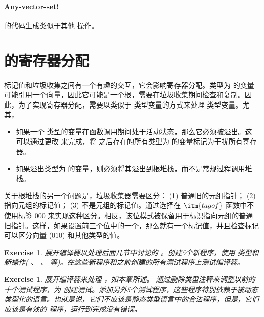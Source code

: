\documentclass[11pt]{book}
\newtheorem{exercise}[theorem]{Exercise}
\begin{document}
\paragraph{Any-vector-set!}

  的代码生成类似于其他  操作。

\section{ \LangAny{} 的寄存器分配}
\label{sec:register-allocation-Rany}

标记值和垃圾收集之间有一个有趣的交互，它会影响寄存器分配。类型为  的变量可能引用一个向量，因此它可能是一个根，需要在垃圾收集期间检查和复制。因此，为了实现寄存器分配，需要以类似于  类型变量的方式来处理  类型变量。尤其，
\begin{itemize}
\item 如果一个  类型的变量在函数调用期间处于活动状态，那么它必须被溢出。这可以通过更改  来完成，将  之后存在的所有类型为 
的变量标记为干扰所有寄存器。

\item 如果溢出类型为  的变量，则必须将其溢出到根堆栈，而不是常规过程调用堆栈。
\end{itemize}

关于根堆栈的另一个问题是，垃圾收集器需要区分： (1) 普通旧的元组指针； (2) 指向元组的标记值； (3) 不是元组的标记值。通过选择在 $\itm{tagof}$
函数中不使用标签 $000$ 来实现这种区分。相反，该位模式被保留用于标识指向元组的普通旧指针。这样，如果设置前三个位中的一个，那么就有一个标记值，并且检查标记可以区分向量 ($010$) 和其他类型的值。

\begin{exercise}\normalfont
展开编译器以处理后面几节中讨论的 \LangAny{} 。创建5个新程序，使用  类型和新操作( 、  、  等)。在这些新程序和之前创建的所有测试程序上测试编译器。
\end{exercise}


\begin{exercise}\normalfont
展开编译器来处理 \LangDyn{} ，如本章所述。
通过删除类型注释来调整以前的十个测试程序，为 \LangDyn{} 创建测试。添加另外5个测试程序，这些程序特别依赖于被动态类型化的语言。也就是说，它们不应该是静态类型语言中的合法程序，但是，它们应该是有效的 \LangDyn{} 程序，运行到完成没有错误。
\end{exercise}
\end{document}

